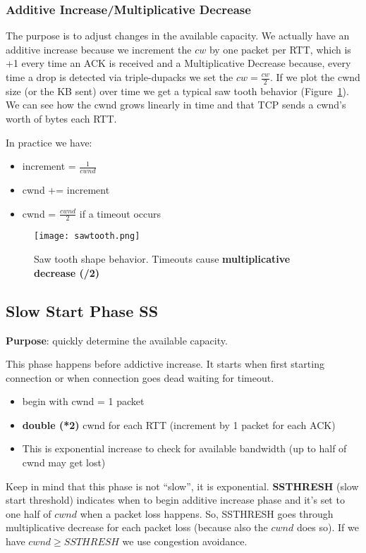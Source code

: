 \subsubsection{Additive Increase/Multiplicative Decrease}

The purpose is to adjust changes in the available capacity.
We actually have an additive increase because we increment the $cw$ by one
packet per RTT, which is +1 every time an ACK is received and a Multiplicative
Decrease because, every time a drop is detected via triple-dupacks we set the
$cw=\frac{cw}{2}$. If we plot the cwnd size (or the KB sent) over time we get a
typical saw tooth behavior (Figure~\ref{fig:tcp:sawtooth}). We can see how the
cwnd grows linearly in time and that TCP sends a cwnd's worth of bytes each RTT.

In practice we have:
\begin{itemize}
  \item increment = $\frac{1}{cwnd}$
  \item cwnd += increment
  \item cwnd = $\frac{cwnd}{2}$ if a timeout occurs
\end{itemize}

\begin{figure}[t]
\texttt{[image: sawtooth.png]}
\caption[Saw tooth shape behavior]{Saw tooth shape behavior. Timeouts cause
  \textbf{multiplicative decrease (/2)}}
\label{fig:tcp:sawtooth}
\end{figure}

\subsection{Slow Start Phase SS}

\textbf{Purpose}: quickly determine the available capacity.

\noindent This phase happens before addictive increase. It starts when first
starting connection or when connection goes dead waiting for timeout.

\begin{itemize}
\item begin with cwnd = 1 packet
\item \textbf{double (*2)} cwnd for each RTT (increment by 1 packet for each
  ACK)
\item This is exponential increase to check for available bandwidth (up to half
  of cwnd may get lost)
\end{itemize}

Keep in mind that this phase is not ``slow'', it is exponential.
\textbf{SSTHRESH} (slow start threshold) indicates when to begin additive
increase phase and it's set to one half of $cwnd$ when a packet loss happens.
So, SSTHRESH goes through multiplicative decrease for each packet loss (because
also the $cwnd$ does so).
If we have $cwnd \ge SSTHRESH$ we use congestion avoidance.

